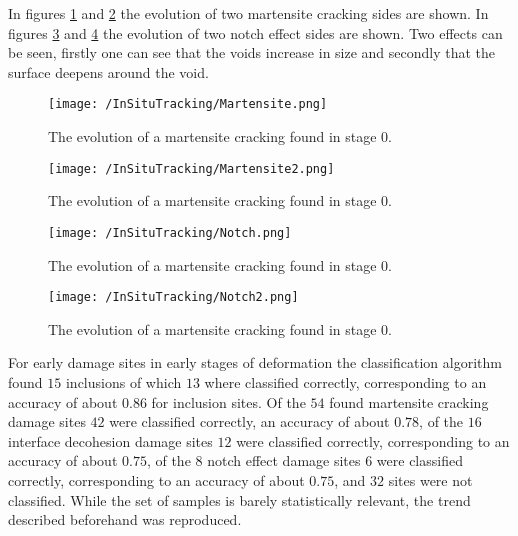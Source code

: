 In figures \ref{fig:MCEV1} and \ref{fig:MCEV2} the evolution of two martensite cracking sides are shown. In figures \ref{fig:NEEV1} and \ref{fig:NEEV2} the evolution of two notch effect sides are shown. Two effects can be seen, firstly one can see that the voids increase in size and secondly that the surface deepens around the void. \\

\begin{figure}
\texttt{[image: /InSituTracking/Martensite.png]}
\caption{The evolution of a martensite cracking found in stage 0.}
\label{fig:MCEV1}
\end{figure}

\begin{figure}
\texttt{[image: /InSituTracking/Martensite2.png]}
\caption{The evolution of a martensite cracking found in stage 0.}
\label{fig:MCEV2}
\end{figure}



\begin{figure}
\texttt{[image: /InSituTracking/Notch.png]}
\caption{The evolution of a martensite cracking found in stage 0.}
\label{fig:NEEV1}
\end{figure}

\begin{figure}
\texttt{[image: /InSituTracking/Notch2.png]}
\caption{The evolution of a martensite cracking found in stage 0.}
\label{fig:NEEV2}
\end{figure}



For early damage sites in early stages of deformation the classification algorithm found $15$ inclusions of which $13$ where classified correctly, corresponding to an accuracy of about $0.86$ for inclusion sites. Of the $54$ found martensite cracking damage sites $42$ were classified correctly, an accuracy of about $0.78$, of the $16$ interface decohesion damage sites $12$ were classified correctly, corresponding to an accuracy of about $0.75$, of the $8$ notch effect damage sites $6$ were classified correctly, corresponding to an accuracy of about $0.75$, and $32$ sites were not classified. While the set of samples is barely statistically relevant, the trend described beforehand was reproduced. \\

